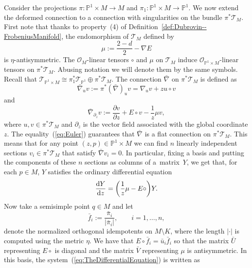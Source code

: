 \documentclass[pdftex]{sigma}
\numberwithin{equation}{section}
\begin{document}
Consider the projections $\pi\colon\mathbb{P}^{1}\times M\rightarrow M$ and $\pi_{1}\colon\mathbb{P}^{1}\times M\rightarrow\mathbb{P}^{1}$. We now extend the deformed connection to a connection with singularities on the bundle $\pi^{*}\mathcal{T}_{M}$. First note that thanks to property~(4) of Definition~\ref{def:Dubrovin--FrobeniusManifold}, the endomorphism of $\mathcal{T}_{M}$ defined by
\begin{equation*}
 \mu:=\frac{2-d}{2}-\nabla E
\end{equation*}
is $\eta$-antisymmetric. The $\mathcal{O}_{M}$-linear tensors $\circ$ and $\mu$ on $\mathcal{T}_{M}$ induce $\mathcal{O}_{\mathbb{P}^{1}\times M}$-linear tensors on $\pi^{*}\mathcal{T}_{M}$. Abusing notation we will denote them by the same symbols. Recall that $\mathcal{T}_{\mathbb{P}^{1}\times M}\cong \pi^{*}_{1}\mathcal{T}_{\mathbb{P}^{1}}\oplus \pi^{*}\mathcal{T}_{M}$. The connection $\bar{\nabla}$ on $\pi^{*}\mathcal{T}_{M}$ is defined as
\begin{equation*}
 \bar{\nabla}_{u}v:=\pi^{*}\left(\bar{\nabla}\right)_{u}v =\nabla_{u}v+zu\circ v
 \end{equation*}
 and
 \begin{equation*}
 \bar{\nabla}_{\partial_{z}}v:=\frac{\partial v}{\partial z}+E\circ v-\frac{1}{z}\mu v,
 \end{equation*}
where $u,v\in\pi^{*}\mathcal{T}_{ M}$ and $\partial_{z}$ is the vector field associated with the global coordinate $z$. The equality~(\ref{eq:Euler}) guarantees that $\bar{\nabla}$ is a flat connection on $\pi^{*}\mathcal{T}_{M}$. This means that for any point $(z,p)\in\mathbb{P}^{1}\times M$ we can find $n$ linearly independent sections $v_{i}\in\pi^{*}\mathcal{T}_{M}$ that satisfy $\bar{\nabla}v_{i}=0$. In particular, fixing a basis and putting the components of these $n$ sections as columns of a~matrix~$Y$, we get that, for each $p\in M$, $Y$ satisfies the ordinary differential equation
\begin{equation}
 \label{eq:TheDifferentialEquation}
 \frac{{\rm d}Y}{{\rm d}z}=\biggl(\frac{1}{z}\mu - E\circ \biggr)Y.
 \end{equation}
 Now take a semisimple point $q\in M$ and let
 \begin{equation*}
 \bar{f}_{i}:=\frac{\bar{\pi}_{i}}{|\bar{\pi}_{i}|}, \qquad i=1,\dots,n,
 \end{equation*}
 denote the normalized orthogonal idempotents on $M\setminus K$, where the length $|\cdot|$ is computed using the metric $\eta$. We have that $E\circ \bar{f}_{i}=\bar{u}_{i}\bar{f}_{i}$ so that the matrix $\bar{U}$ representing $E\circ$ is diagonal and the matrix $\bar{V}$ representing $\mu$ is antisymmetric. In this basis, the system~(\ref{eq:TheDifferentialEquation}) is written as
\end{document}
